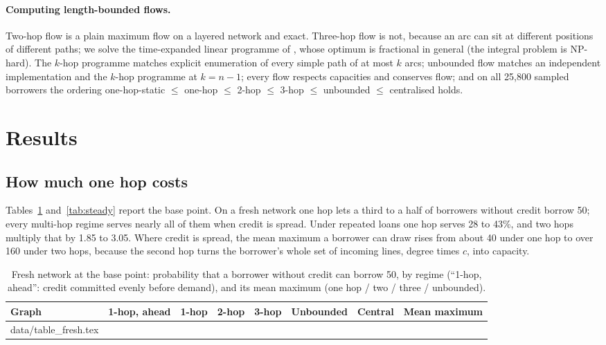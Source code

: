 \documentclass[11pt]{article}
\makeatletter
\theoremstyle{plain}
\theoremstyle{definition}
\newcommand{\inputrows}[1]{\@@input #1 }
\makeatother
\begin{document}
\paragraph{Computing length-bounded flows.} Two-hop flow is a plain maximum flow on a layered network
and exact. Three-hop flow is not, because an arc can sit at different positions of different paths;
we solve the time-expanded linear programme of \citet{baier2010}, whose optimum is fractional in
general (the integral problem is NP-hard). The $k$-hop programme matches explicit enumeration of every
simple path of at most $k$ arcs; unbounded flow matches an independent implementation and the
$k$-hop programme at $k=n-1$; every flow respects capacities and conserves flow; and on all 25,800
sampled borrowers the ordering one-hop-static $\le$ one-hop $\le$ 2-hop $\le$ 3-hop $\le$ unbounded
$\le$ centralised holds.

\section{Results}\label{sec:results}

\subsection{How much one hop costs}

Tables~\ref{tab:fresh} and~\ref{tab:steady} report the base point. On a fresh network one hop lets a
third to a half of borrowers without credit borrow 50; every multi-hop regime serves nearly all of
them when credit is spread. Under repeated loans one hop serves 28 to 43\%, and two hops multiply that
by 1.85 to 3.05. Where credit is spread, the mean maximum a borrower can draw rises from about 40 under one
hop to over 160 under two hops, because the second hop turns the borrower's whole set of incoming lines, degree times
$c$, into capacity.

\begin{table}[ht]
  \centering\small
  \caption{Fresh network at the base point: probability that a borrower without credit can borrow
  50, by regime (``1-hop, ahead'': credit committed evenly before demand), and its mean maximum (one
  hop / two / three / unbounded).}
  \label{tab:fresh}
  \footnotesize\setlength{\tabcolsep}{3.5pt}
  \begin{tabular}{lrrrrrrl}
    \toprule
    Graph & 1-hop, ahead & 1-hop & 2-hop & 3-hop & Unbounded & Central & Mean maximum \\
    \midrule
    \inputrows{data/table_fresh.tex}
    \bottomrule
  \end{tabular}
\end{table}
\end{document}
